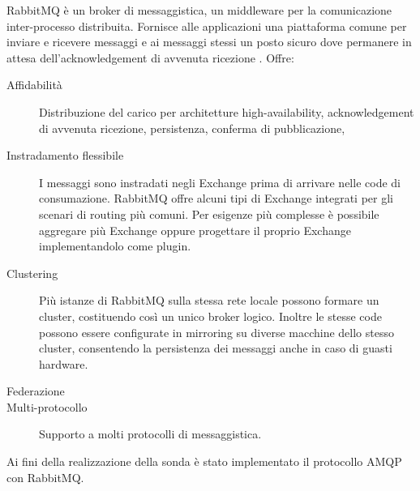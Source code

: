 \documentclass[../main.tex]{subfiles}
\begin{document}
\begin{description}[nolistsep]
\item[RabbitMQ]
RabbitMQ è un broker di messaggistica, un middleware per la comunicazione inter-processo distribuita. 
Fornisce alle applicazioni una piattaforma comune per inviare e ricevere messaggi e ai messaggi stessi un posto sicuro dove permanere in attesa dell'acknowledgement di avvenuta ricezione \cite{RabbitMQWebsite}. Offre:
\begin{description}
\item[Affidabilità]Distribuzione del carico per architetture high-availability, acknowledgement di avvenuta ricezione, persistenza, conferma di pubblicazione, 
\item[Instradamento flessibile]I messaggi sono instradati negli Exchange prima di arrivare nelle code di consumazione. RabbitMQ offre alcuni tipi di Exchange integrati per gli scenari di routing più comuni. Per esigenze più complesse è possibile aggregare più Exchange oppure progettare il proprio Exchange implementandolo come plugin.
\item[Clustering]Più istanze di RabbitMQ sulla stessa rete locale possono formare un cluster, costituendo così un unico broker logico.
Inoltre le stesse code possono essere configurate in mirroring su diverse macchine dello stesso cluster, consentendo la persistenza dei messaggi anche in caso di guasti hardware.
\item[Federazione]
\item[Multi-protocollo]Supporto a molti protocolli di messaggistica.
\end{description}
Ai fini della realizzazione della sonda è stato implementato il protocollo AMQP con RabbitMQ.


\end{description}
\end{document}
